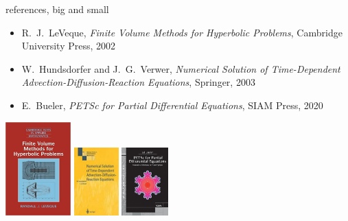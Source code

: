 \documentclass[10pt,dvipsnames,usepdftitle=false,
hyperref={pdftitle = {Finite volume methods},
    pdfauthor = {Ed Bueler}}]{beamer}
\begin{document}
\begin{frame}{references, big and small}
\begin{itemize}
\item {\large \alert{R.~J.~LeVeque, \emph{Finite Volume Methods for Hyperbolic Problems}, Cambridge University Press, 2002}}

\medskip
\item W.~Hundsdorfer and J.~G.~Verwer, \emph{Numerical Solution of Time-Dependent Advection-Diffusion-Reaction Equations}, Springer, 2003
\item E.~Bueler, \emph{PETSc for Partial Differential Equations}, SIAM Press, 2020
\end{itemize}

\bigskip

\begin{center}
\includegraphics[height=36mm]{figs/covers/leveque} \qquad \includegraphics[height=26mm]{figs/covers/hv} \qquad \includegraphics[height=26mm]{figs/covers/bueler}
\end{center}
\end{frame}
\end{document}
